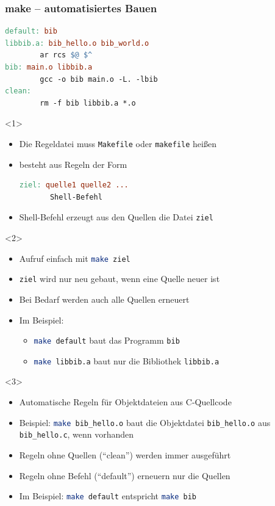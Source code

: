 \documentclass{slides}
\begin{document}
\begin{frame}
  \frametitle{make -- automatisiertes Bauen}
\begin{lstlisting}[language=make,title=Makefile,escapechar={}]
default: bib
libbib.a: bib_hello.o bib_world.o
        ar rcs $@ $^
bib: main.o libbib.a
        gcc -o bib main.o -L. -lbib
clean:
        rm -f bib libbib.a *.o
\end{lstlisting}

  \begin{onlyenv}<1>
    \begin{itemize}
    \item Die Regeldatei muss \lstinline!Makefile! oder \lstinline!makefile! heißen
    \item besteht aus Regeln der Form
\begin{lstlisting}[language=make,escapechar={},style=unframed]
ziel: quelle1 quelle2 ...
       Shell-Befehl
\end{lstlisting}
    \item Shell-Befehl erzeugt aus den Quellen die Datei \lstinline!ziel!
    \end{itemize}
  \end{onlyenv}

  \begin{onlyenv}<2>
    \begin{itemize}
    \item Aufruf einfach mit \lstinline[language=bash]!make ziel!
    \item \lstinline!ziel! wird nur neu gebaut, wenn eine Quelle neuer ist
    \item Bei Bedarf werden auch alle Quellen erneuert
    \item Im Beispiel:
      \begin{itemize}
      \item \lstinline[language=bash]!make default! baut das Programm \lstinline!bib!
      \item \lstinline[language=bash]!make libbib.a! baut nur die Bibliothek \lstinline!libbib.a!
      \end{itemize}
    \end{itemize}
  \end{onlyenv}

  \begin{onlyenv}<3>
    \begin{itemize}
    \item Automatische Regeln für Objektdateien aus C-Quellcode
    \item Beispiel: \lstinline[language=bash]!make bib_hello.o! baut die Objektdatei \lstinline!bib_hello.o!
      aus \lstinline!bib_hello.c!, wenn vorhanden
    \item Regeln ohne Quellen ("`clean"') werden immer ausgeführt
    \item Regeln ohne Befehl ("`default"') erneuern nur die Quellen
    \item Im Beispiel: \lstinline[language=bash]!make default! entspricht \lstinline[language=bash]!make bib!
    \end{itemize}
  \end{onlyenv}
\end{frame}
\end{document}
